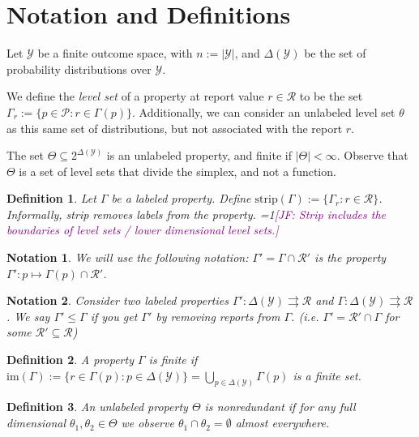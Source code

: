 \documentclass[12pt]{article}
\newcommand{\Comments}{1}
\newcommand{\mynote}[2]{\ifnum\Comments=1\textcolor{#1}{#2}\fi}
\newcommand{\jessie}[1]{\mynote{purple}{[JF: #1]}}
\renewcommand{\P}{\mathcal{P}}
\newcommand{\R}{\mathcal{R}}
\newcommand{\Y}{\mathcal{Y}}
\newcommand{\toto}{\rightrightarrows}
\newcommand{\im}{\text{im}}
\newtheorem{definition}{Definition}
\newtheorem{notation}{Notation}
\begin{document}
\section{Notation and Definitions}


Let $\Y$ be a finite outcome space, with $n:=|\Y|$, and $\Delta(\Y)$ be the set of probability distributions over $\Y$.

We define the \emph{level set} of a property at report value $r\in\R$ to be the set $\Gamma_r := \{p\in\P : r \in \Gamma(p)\}$.
Additionally, we can consider an unlabeled level set $\theta$ as this same set of distributions, but not associated with the report $r$.

The set $\Theta \subseteq 2^{\Delta(\Y)}$ is an unlabeled property, and finite if $|\Theta| < \infty$.
Observe that $\Theta$ is a set of level sets that divide the simplex, and not a function.


\begin{definition}
Let $\Gamma$ be a labeled property.
Define $\text{strip}(\Gamma) := \{ \Gamma_r : r \in \R \}$.
Informally, strip removes labels from the property.
\jessie{Strip includes the boundaries of level sets / lower dimensional level sets.}
\end{definition}

\begin{notation}
We will use the following notation: $\Gamma' = \Gamma \cap \R'$ is the property $\Gamma' : p \mapsto \Gamma(p) \cap \R'$.  
\end{notation}

\begin{notation}
  Consider two labeled properties $\Gamma' : \Delta(\Y) \toto \R$ and $\Gamma : \Delta(\Y) \toto \R$.
  We say $\Gamma' \leq \Gamma$ if you get $\Gamma'$ by removing reports from $\Gamma$.
  (i.e. $\Gamma' = \R' \cap \Gamma$ for some $\R' \subseteq \R$)
\end{notation}

\begin{definition}
A property $\Gamma$ is \emph{finite} if $\im(\Gamma) := \{r\in\Gamma(p) : p\in\Delta(\Y)\} = \bigcup_{p\in\Delta(\Y)} \Gamma(p)$ is a finite set.
\end{definition}

\begin{definition}\label{def:unlabeled-nonredundant}
  An unlabeled property $\Theta$ is \emph{nonredundant} if for any full dimensional $\theta_1, \theta_2 \in \Theta$ we observe $\theta_1 \cap \theta_2 = \emptyset$ almost everywhere.
\end{definition}
\end{document}
